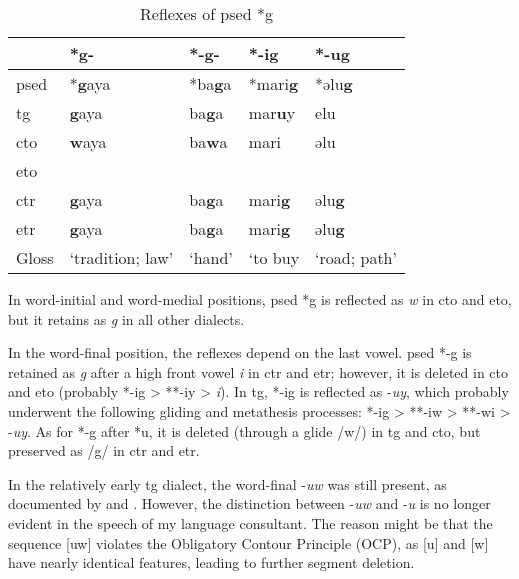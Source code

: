 \begin{table}[!htbp]
\centering
\caption{Reflexes of \acl{psed} *g}
\label{tab:psed_g}
\begin{tabular}{lllll}
\hline
           & *g-              & *-g-   & *-i\textbf{g}              & *-u\textbf{g}         \\ \hline
\acs{psed} & *\textbf{g}aya            & *ba\textbf{g}a  & *mari\textbf{g}            & *əlu\textbf{g}        \\ \hdashline
\acs{tg}   & \textbf{g}aya             & ba\textbf{g}a   & mar\textbf{u}y             & elu          \\
\acs{cto}  & \textbf{w}aya             & ba\textbf{w}a   & mari              & əlu          \\
\acs{eto}  &                  &        &                   &              \\
\acs{ctr}  & \textbf{g}aya             & ba\textbf{g}a   & mari\textbf{g}             & əlu\textbf{g}         \\
\acs{etr}  & \textbf{g}aya             & ba\textbf{g}a   & mari\textbf{g}             & əlu\textbf{g}         \\ \hline
Gloss      & `tradition; law' & `hand' & `to buy \acs(av)' & `road; path' \\ \hline
\end{tabular}
\end{table}

In word-initial and word-medial positions, \acl{psed} *g is reflected as \textit{w} in \acl{cto} and \acl{eto}, but it retains as \textit{g} in all other dialects. 

In the word-final position, the reflexes depend on the last vowel. \acl{psed} *-g is retained as \textit{g} after a high front vowel \textit{i} in \acl{ctr} and \acl{etr}; however, it is deleted in \acl{cto} and \acl{eto} (probably *-ig > **-iy > \textit{i}). In \acl{tg}, *-ig is reflected as -\textit{uy}, which probably underwent the following gliding and metathesis processes: *-ig > **-iw > **-wi > -\textit{uy}. As for *-g after *u, it is deleted (through a glide /w/) in \acl{tg} and \acl{cto}, but preserved as /g/ in \acl{ctr} and \acl{etr}. 

In the relatively early \acl{tg} dialect, the word-final -\textit{uw} was still present, as documented by \textcite{yang1976sedpho} and \textcite{li1981paic}. However, the distinction between -\textit{uw} and -\textit{u} is no longer evident in the speech of my language consultant. The reason might be that the sequence [uw] violates the Obligatory Contour Principle (OCP), as [u] and [w] have nearly identical features, leading to further segment deletion.

